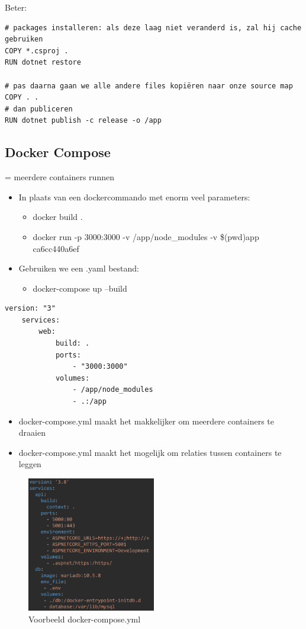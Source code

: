\documentclass{article}
\begin{document}
Beter:

\begin{verbatim}
# packages installeren: als deze laag niet veranderd is, zal hij cache gebruiken
COPY *.csproj .
RUN dotnet restore

# pas daarna gaan we alle andere files kopiëren naar onze source map
COPY . .
# dan publiceren
RUN dotnet publish -c release -o /app
\end{verbatim}


\subsection{Docker Compose}

= meerdere containers runnen

\begin{itemize}
    \item In plaats van een dockercommando met enorm veel parameters:
    \begin{itemize}
        \item docker build .
        \item docker run -p 3000:3000 -v /app/node\_modules -v \$(pwd)\:\/app ca6cc440a6ef
    \end{itemize}
    \item Gebruiken we een .yaml bestand:
    \begin{itemize}
        \item docker-compose up --build
    \end{itemize}
\end{itemize}

\begin{verbatim}
version: "3"
    services:
        web:
            build: .
            ports:
                - "3000:3000"
            volumes:
                - /app/node_modules
                - .:/app
\end{verbatim}

\begin{itemize}
    \item docker-compose.yml maakt het makkelijker om meerdere containers te draaien
    \item docker-compose.yml maakt het mogelijk om relaties tussen containers te leggen
\end{itemize}

\begin{figure}[H]
    \centering
    \includegraphics[width=0.5\textwidth]{docker-compose.png}
    \caption{Voorbeeld docker-compose.yml}
\end{figure}
\end{document}

